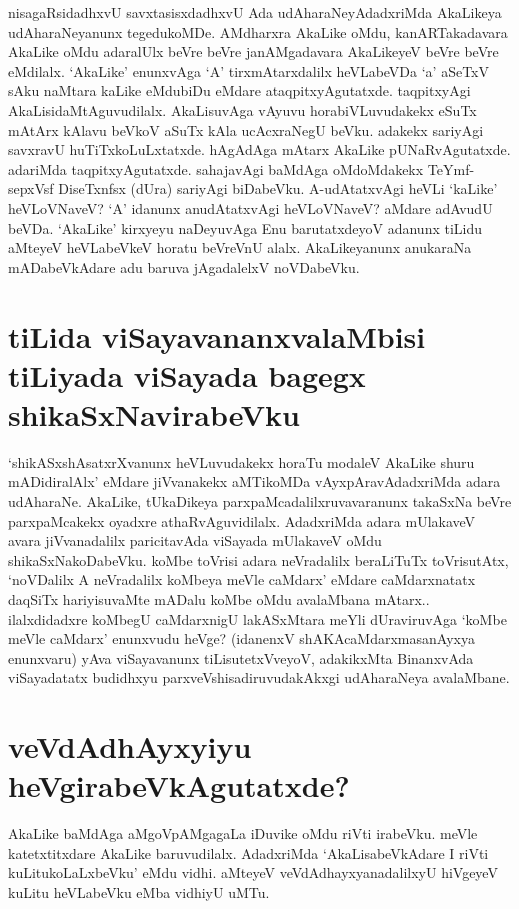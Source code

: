 nisagaRsidadhxvU savxtasisxdadhxvU  Ada udAharaNeyAdadxriMda AkaLikeya udAharaNeyanunx  tegedukoMDe. AMdharxra AkaLike  oMdu, kanARTakadavara AkaLike oMdu adaralUlx beVre beVre janAMgadavara  AkaLikeyeV beVre beVre eMdilalx. `AkaLike' enunxvAga `A' tirxmAtarxdalilx  heVLabeVDa `a'  aSeTxV sAku naMtara kaLike  eMdubiDu  eMdare  ataqpitxyAgutatxde. taqpitxyAgi AkaLisidaMtAguvudilalx. AkaLisuvAga vAyuvu horabiVLuvudakekx  eSuTx  mAtArx kAlavu  beVkoV aSuTx  kAla ucAcxraNegU beVku. adakekx   sariyAgi  savxravU huTiTxkoLuLxtatxde. hAgAdAga mAtarx  AkaLike  pUNaRvAgutatxde. adariMda taqpitxyAgutatxde. sahajavAgi baMdAga oMdoMdakekx  TeYmf-sepxVsf DiseTxnfsx  (dUra) sariyAgi biDabeVku. A-udAtatxvAgi heVLi `kaLike' heVLoVNaveV?  `A' idanunx  anudAtatxvAgi heVLoVNaveV? aMdare adAvudU beVDa. `AkaLike' kirxyeyu naDeyuvAga Enu barutatxdeyoV adanunx  tiLidu aMteyeV heVLabeVkeV horatu beVreVnU alalx. AkaLikeyanunx  anukaraNa mADabeVkAdare adu baruva jAgadalelxV noVDabeVku.

\section*{tiLida viSayavananxvalaMbisi tiLiyada viSayada bagegx  shikaSxNavirabeVku}

`shikASxshAsatxrXvanunx  heVLuvudakekx  horaTu modaleV AkaLike  shuru mADidiralAlx' eMdare jiVvanakekx  aMTikoMDa vAyxpAravAdadxriMda adara udAharaNe. AkaLike, tUkaDikeya parxpaMcadalilxruvavaranunx  takaSxNa  beVre  parxpaMcakekx   oyadxre athaRvAguvidilalx. AdadxriMda adara mUlakaveV avara jiVvanadalilx paricitavAda viSayada mUlakaveV oMdu shikaSxNakoDabeVku. koMbe toVrisi adara neVradalilx beraLiTuTx  toVrisutAtx, `noVDalilx A neVradalilx  koMbeya meVle caMdarx' eMdare  caMdarxnatatx  daqSiTx  hariyisuvaMte  mADalu koMbe oMdu avalaMbana mAtarx..  ilalxdidadxre koMbegU caMdarxnigU lakASxMtara meYli dUraviruvAga `koMbe meVle caMdarx' enunxvudu heVge? (idanenxV shAKAcaMdarxmasanAyxya  enunxvaru) yAva viSayavanunx tiLisutetxVveyoV, adakikxMta  BinanxvAda viSayadatatx  budidhxyu parxveVshisadiruvudakAkxgi udAharaNeya avalaMbane. 

\section*{veVdAdhAyxyiyu heVgirabeVkAgutatxde?}

AkaLike baMdAga aMgoVpAMgagaLa iDuvike  oMdu riVti irabeVku. meVle katetxtitxdare AkaLike baruvudilalx. AdadxriMda `AkaLisabeVkAdare I riVti kuLitukoLaLxbeVku' eMdu vidhi. aMteyeV veVdAdhayxyanadalilxyU hiVgeyeV kuLitu heVLabeVku eMba vidhiyU uMTu.


